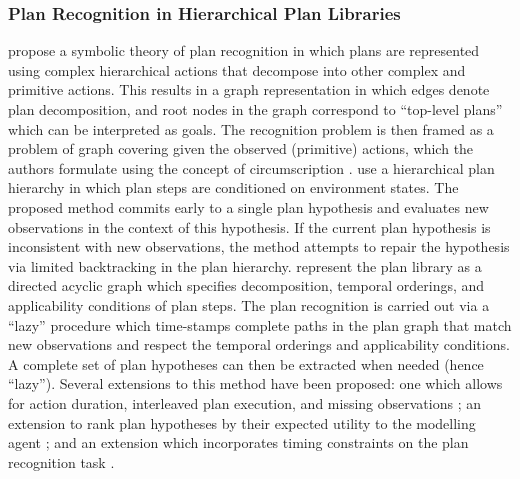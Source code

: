 \documentclass[final,1p,times,authoryear]{elsarticle}
\begin{document}
			\subsubsection{Plan Recognition in Hierarchical Plan Libraries} \label{sec:planrec-hierarch}

\citet{ka1986} propose a symbolic theory of plan recognition in which plans are represented using complex hierarchical actions that decompose into other complex and primitive actions. This results in a graph representation in which edges denote plan decomposition, and root nodes in the graph correspond to ``top-level plans'' which can be interpreted as goals. The recognition problem is then framed as a problem of graph covering given the observed (primitive) actions, which the authors formulate using the concept of circumscription \citep{m1980}. \citet{tr1995} use a hierarchical plan hierarchy in which plan steps are conditioned on environment states. The proposed method commits early to a single plan hypothesis and evaluates new observations in the context of this hypothesis. If the current plan hypothesis is inconsistent with new observations, the method attempts to repair the hypothesis via limited backtracking in the plan hierarchy.  \citet{ak2005} represent the plan library as a directed acyclic graph which specifies decomposition, temporal orderings, and applicability conditions of plan steps. The plan recognition is carried out via a ``lazy'' procedure which time-stamps complete paths in the plan graph that match new observations and respect the temporal orderings and applicability conditions. A complete set of plan hypotheses can then be extracted when needed (hence ``lazy''). Several extensions to this method have been proposed: one which allows for action duration, interleaved plan execution, and missing observations \citep{akz2005}; an extension to rank plan hypotheses by their expected utility to the modelling agent \citep{ak2007}; and an extension which incorporates timing constraints on the plan recognition task \citep{fmbv2014}.
\end{document}
